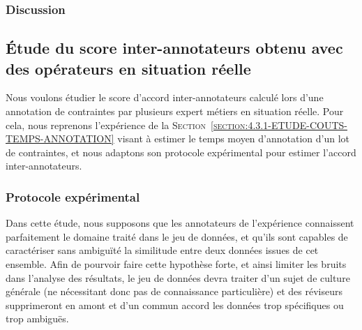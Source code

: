 		\subsubsection{Discussion}
		
		
			
			
			
	\subsection{Étude du score inter-annotateurs obtenu avec des opérateurs en situation réelle}
	\label{section:4.6.3-ETUDE-ROBUSTESSE-SCORE-INTER-ANNOTATEURS}
		
		Nous voulons étudier le score d'accord inter-annotateurs calculé lors d'une annotation de contraintes par plusieurs expert métiers en situation réelle.
		Pour cela, nous reprenons l'expérience de la \textsc{Section~\ref{section:4.3.1-ETUDE-COUTS-TEMPS-ANNOTATION}} visant à estimer le temps moyen d'annotation d'un lot de contraintes, et nous adaptons son protocole expérimental pour estimer l'accord inter-annotateurs.
		
	
		\subsubsection{Protocole expérimental}
			
			\begin{leftBarWarning}
				Dans cette étude, nous supposons que les annotateurs de l'expérience connaissent parfaitement le domaine traité dans le jeu de données, et qu'ils sont capables de caractériser sans ambiguïté la similitude entre deux données issues de cet ensemble.
				Afin de pourvoir faire cette hypothèse forte, et ainsi limiter les bruits dans l'analyse des résultats, le jeu de données devra traiter d'un sujet de culture générale (ne nécessitant donc pas de connaissance particulière) et des réviseurs supprimeront en amont et d'un commun accord les données trop spécifiques ou trop ambiguës.
			\end{leftBarWarning}
			
